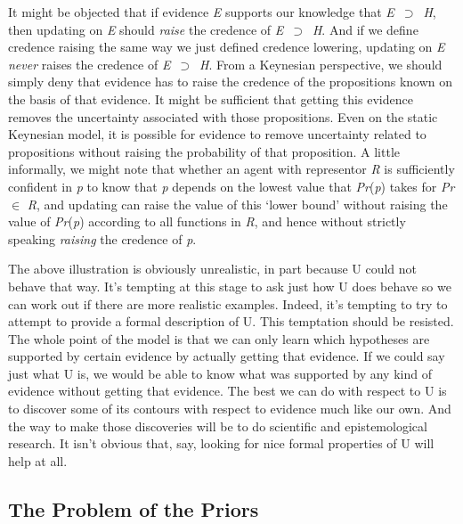 It might be objected that if evidence \textit{E} supports our knowledge that \textit{E}~${\supset}$~\textit{H}, then updating on \textit{E} should \textit{raise} the credence of \textit{E}~${\supset}$~\textit{H}. And if we define credence raising the same way we just defined credence lowering, updating on \textit{E} \textit{never} raises the credence of \textit{E}~${\supset}$~\textit{H}. From a Keynesian perspective, we should simply deny that evidence has to raise the credence of the propositions known on the basis of that evidence. It might be sufficient that getting this evidence removes the uncertainty associated with those propositions. Even on the static Keynesian model, it is possible for evidence to remove uncertainty related to propositions without raising the probability of that proposition. A little informally, we might note that whether an agent with representor \textit{R} is sufficiently confident in \textit{p} to know that \textit{p} depends on the lowest value that \textit{Pr}(\textit{p}) takes for \textit{Pr} ${\in}$ \textit{R}, and updating can raise the value of this `lower bound' without raising the value of \textit{Pr}(\textit{p}) according to all functions in \textit{R}, and hence without strictly speaking \textit{raising }the credence of \textit{p}.

The above illustration is obviously unrealistic, in part because U could not behave that way. It's tempting at this stage to ask just how U does behave so we can work out if there are more realistic examples. Indeed, it's tempting to try to attempt to provide a formal description of U. This temptation should be resisted. The whole point of the model is that we can only learn which hypotheses are supported by certain evidence by actually getting that evidence. If we could say just what U is, we would be able to know what was supported by any kind of evidence without getting that evidence. The best we can do with respect to U is to discover some of its contours with respect to evidence much like our own. And the way to make those discoveries will be to do scientific and epistemological research. It isn't obvious that, say, looking for nice formal properties of U will help at all.


\subsection{The Problem of the Priors}

